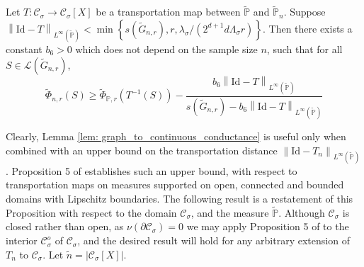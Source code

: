 \documentclass[11pt,twoside]{article}
\newcommand{\set}[1]{\left\{#1\right\}}
\newcommand{\abs}[1]{\left \lvert #1 \right \rvert}
\newcommand{\norm}[1]{\left\lVert#1\right\rVert}
\newcommand{\1}{\mathbbm{1}}
\newcommand{\Xbf}{X}
\newcommand{\Pbb}{\mathbb{P}}
\newcommand{\Cset}{\mathcal{C}}
\newcommand{\Csig}{\Cset_{\sigma}}
\begin{document}
\begin{lemma}
	\label{lem: graph_to_continuous_conductance}
	Let $T:\Csig \to \Csig[\Xbf]$ be a transportation map between $\widetilde{\Pbb}$ and $\widetilde{\Pbb}_n$. Suppose $\norm{\mathrm{Id} - T}_{L^{\infty}(\widetilde{\Pbb})} < \min \set{s(\widetilde{G}_{n,r}),r, \lambda_{\sigma}/(2^{d+1}d\Lambda_{\sigma}r)}$. Then there exists a constant $b_6 > 0$ which does not depend on the sample size $n$, such that for all $S \in \mathcal{L}(\widetilde{G}_{n,r})$, 
	\begin{equation}
	\label{eqn: graph_to_continuous_conductance}
	\widetilde{\Phi}_{n,r}(S) \geq \widetilde{\Phi}_{\Pbb,r}(T^{-1}(S)) - \frac{b_6\norm{\mathrm{Id} - T}_{L^{\infty}(\widetilde{\Pbb})} }{s(\widetilde{G}_{n,r}) - b_6 \norm{\mathrm{Id} - T}_{L^{\infty}(\widetilde{\Pbb})}  }
	\end{equation}
\end{lemma}

Clearly, Lemma \ref{lem: graph_to_continuous_conductance} is useful only when combined with an upper bound on the transportation distance $\norm{\mathrm{Id} - T_n}_{L^{\infty}(\widetilde{\Pbb})}$. Proposition 5 of \cite{garciatrillos16} establishes such an upper bound, with respect to transportation maps on measures supported on open, connected and bounded domains with Lipschitz boundaries. The following result is a restatement of this Proposition with respect to the domain $\Csig$, and the measure $\widetilde{\Pbb}$. Although $\Csig$ is closed rather than open, as $\nu(\partial \Csig) = 0$ we may apply Proposition 5 of \cite{garciatrillos16} to the interior $\Csig^o$ of $\Csig$, and the desired result will hold for any arbitrary extension of $T_n$ to $\Csig$. Let $\widetilde{n} = \abs{\Csig[\Xbf]}$. 
\end{document}
